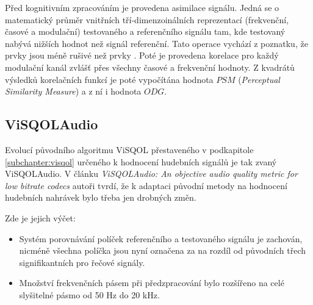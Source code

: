 Před kognitivním zpracováním je provedena asimilace signálu. Jedná se o matematický průměr vnitřních tří-dimenzoinálních reprezentací (frekvenční, časové a modulační) testovaného a referenčního signálu tam, kde testovaný nabývá nižších hodnot než signál referenční. Tato operace vychází z poznatku, že  prvky jsou méně rušivé než prvky . 
Poté je provedena korelace pro každý modulační kanál zvlášť přes všechny časové a frekvenční hodnoty. Z kvadrátů výsledků korelačních funkcí je poté vypočítána hodnota $PSM$ (\textit{Perceptual Similarity Measure}) a z ní i hodnota $ODG$.

\subsection{ViSQOLAudio}

Evolucí původního algoritmu ViSQOL přestaveného v podkapitole \ref{subchapter:visqol} určeného k hodnocení hudebních signálů je tak zvaný ViSQOLAudio. V článku \textit{ViSQOLAudio: An objective audio quality metric for low bitrate codecs} \cite{article:visqolaudio} autoři tvrdí, že k adaptaci původní metody na hodnocení hudebních nahrávek bylo třeba jen drobných změn.

\medskip

Zde je jejich výčet:

\begin{itemize}
    \item Systém porovnávání políček referenčního a testovaného signálu je zachován, nicméně všechna políčka jsou nyní označena za  na rozdíl od původních třech signifikantních pro řečové signály.
    \item Množství frekvenčních pásem při předzpracování bylo rozšířeno na celé slyšitelné pásmo od 50 Hz do 20 kHz.
\end{itemize}